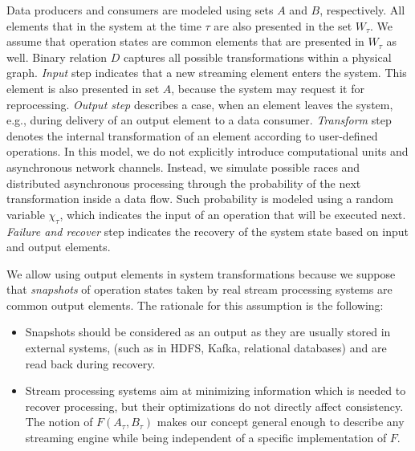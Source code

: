 Data producers and consumers are modeled using sets $A$ and $B$, respectively. All elements that in the system at the time $\tau$ are also presented in the set $W_\tau$. We assume that operation states are common elements that are presented in $W_\tau$ as well. Binary relation $D$ captures all possible transformations within a physical graph. {\em Input} step indicates that a new streaming element enters the system. This element is also presented in set $A$, because the system may request it for reprocessing. {\em Output step} describes a case, when an element leaves the system, e.g., during delivery of an output element to a data consumer. {\em Transform} step denotes the internal transformation of an element according to user-defined operations. In this model, we do not explicitly introduce computational units and asynchronous network channels. Instead, we simulate possible races and distributed asynchronous processing through the probability of the next transformation inside a data flow. Such probability is modeled using a random variable $\chi_\tau$, which indicates the input of an operation that will be executed next. {\em Failure and recover} step indicates the recovery of the system state based on input and output elements.


We allow using output elements in system transformations because we suppose that {\em snapshots} of operation states taken by real stream processing systems are common output elements. The rationale for this assumption is the following:

\begin{itemize}
    \item Snapshots should be considered as an output as they are usually stored in external systems, (such as in HDFS, Kafka, relational databases)   and are read back during recovery. 
    \item Stream processing systems aim at minimizing information which is needed to recover processing, but their optimizations do not directly affect consistency. The notion of $F(A_\tau, B_\tau)$ makes our concept general enough to describe any streaming engine while being independent of a specific implementation of $F$.
\end{itemize}

